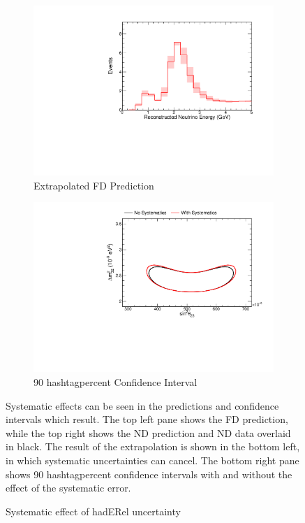 {\begin{figure}
\begin{center}
\begin{subfigure}[c]{0.49\textwidth}
\includegraphics[width=\textwidth]{figures/systs/prediction/fd_extrap_prediction_hadERel.pdf}
\caption*{Extrapolated FD Prediction}
\end{subfigure}
\begin{subfigure}[c]{0.49\textwidth}
\includegraphics[width=\textwidth]{figures/systs/prediction/fd_extrap_contour_hadERel.pdf}
\caption*{90 hashtagpercent Confidence Interval}
\end{subfigure}
\end{center}
\caption{Systematic effect of hadERel uncertainty}{
Systematic effects can be seen in the predictions and confidence intervals
which result.
The top left pane shows the FD prediction, while the top right shows the
ND prediction and ND data overlaid in black.
The result of the extrapolation is shown in the bottom left, in which
systematic uncertainties can cancel.
The bottom right pane shows 90 hashtagpercent confidence intervals with and without
the effect of the systematic error.}
\label{syst_fig_hadERel}


\end{figure}}
